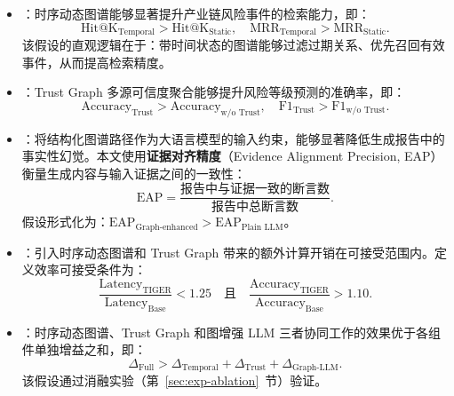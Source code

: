 \begin{itemize}
    \item {}：时序动态图谱能够显著提升产业链风险事件的检索能力，即：
    \begin{equation}
    \text{Hit@K}_{\text{Temporal}} > \text{Hit@K}_{\text{Static}}, \quad \text{MRR}_{\text{Temporal}} > \text{MRR}_{\text{Static}}.
    \end{equation}
    该假设的直观逻辑在于：带时间状态的图谱能够过滤过期关系、优先召回有效事件，从而提高检索精度。

    \item {}：Trust Graph 多源可信度聚合能够提升风险等级预测的准确率，即：
    \begin{equation}
    \text{Accuracy}_{\text{Trust}} > \text{Accuracy}_{\text{w/o Trust}}, \quad \text{F1}_{\text{Trust}} > \text{F1}_{\text{w/o Trust}}.
    \end{equation}

    \item {}：将结构化图谱路径作为大语言模型的输入约束，能够显著降低生成报告中的事实性幻觉。本文使用\textbf{证据对齐精度}（Evidence Alignment Precision, EAP）衡量生成内容与输入证据之间的一致性：
    \begin{equation}
    \text{EAP} = \frac{\text{报告中与证据一致的断言数}}{\text{报告中总断言数}}.
    \end{equation}
    假设形式化为：$\text{EAP}_{\text{Graph-enhanced}} > \text{EAP}_{\text{Plain LLM}}$。

    \item {}：引入时序动态图谱和 Trust Graph 带来的额外计算开销在可接受范围内。定义效率可接受条件为：
    \begin{equation}
    \frac{\text{Latency}_{\text{TIGER}}}{\text{Latency}_{\text{Base}}} < 1.25 \quad \text{且} \quad \frac{\text{Accuracy}_{\text{TIGER}}}{\text{Accuracy}_{\text{Base}}} > 1.10.
    \end{equation}

    \item {}：时序动态图谱、Trust Graph 和图增强 LLM 三者协同工作的效果优于各组件单独增益之和，即：
    \begin{equation}
    \Delta_{\text{Full}} > \Delta_{\text{Temporal}} + \Delta_{\text{Trust}} + \Delta_{\text{Graph-LLM}}.
    \end{equation}
    该假设通过消融实验（第~\ref{sec:exp-ablation}~节）验证。
\end{itemize}

